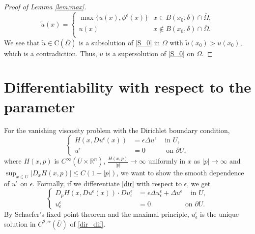 \documentclass[11pt,reqno]{amsart}
\numberwithin{figure}{section}
\theoremstyle{plain}
\theoremstyle{remark}
\numberwithin{equation}{section}
\newcommand{\rmC}{\mathrm{C}}
\begin{document}
\begin{appendices}
\begin{proof}[Proof of Lemma \ref{lem:max}]
\begin{equation*}
    \tilde{u}(x) = \begin{cases}
    \max \big\lbrace u(x),\phi^\varepsilon(x) \big\rbrace &x\in B(x_0,\delta)\cap \overline{\Omega},\\
    u(x)&x\notin B(x_0,\delta)\cap \overline{\Omega}.\\
    \end{cases}
\end{equation*}
We see that $\tilde{u}\in \rmC(\overline{\Omega})$ is a subsolution of \eqref{S_0} in $\Omega$ with $\tilde{u}(x_0) > u(x_0)$, which is a contradiction. Thus, $u$ is a supersolution of \eqref{S_0} on $\overline{\Omega}$.
\end{proof}


\section{Differentiability with respect to the parameter}
\noindent For the vanishing viscosity problem with the Dirichlet boundary condition,
\begin{equation}
\label{dir}
\left\{
  \begin{aligned}
    H(x, Du^\epsilon(x)) &= \epsilon \Delta u^\epsilon \quad \, \text{in } U, \\
              u^\epsilon &= 0 \quad \qquad \text{on } \partial U,
  \end{aligned}
\right.
\end{equation}
where  $H(x,p)$ is $C^\infty(\overline{U}\times \mathbb{R}^n)$, $\displaystyle \frac{H(x,p)}{|p|} \to \infty$ uniformly in $x$ as $|p| \to \infty$ and $\displaystyle \sup_{x\in U}|D_xH(x,p)|\leq C(1+|p|)$, we want to show the smooth dependence of $u^\epsilon$ on $\epsilon$.
Formally, if we differentiate \eqref{dir} with respect to $\epsilon$, we get
\begin{equation}
\label{dir_dif}
\left\{
  \begin{aligned}
    D_pH(x, Du^\epsilon(x))\cdot Du^\epsilon_\epsilon &= \epsilon \Delta u^\epsilon_\epsilon +\Delta u^\epsilon \quad \, \text{in } U, \\
              u^\epsilon_\epsilon &= 0 \quad \qquad  \qquad  \text{on } \partial U.
  \end{aligned}
\right.
\end{equation}
By Schaefer's fixed point theorem and the maximal principle, $u^\epsilon_\epsilon$ is the unique solution in $C^{2,\alpha}(\overline{U})$ of \eqref{dir_dif}. 


\end{appendices}
\end{document}
